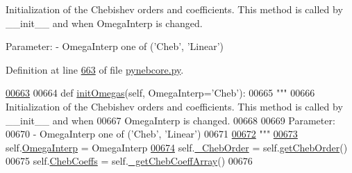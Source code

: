 \begin{DoxyVerb}Initialization of the Chebishev orders and coefficients. This method is called by __init__ and when 
OmegaInterp is changed.

Parameter:
    - OmegaInterp   one of ('Cheb', 'Linear')\end{DoxyVerb}
 

Definition at line \hyperlink{pynebcore_8py_source_l00663}{663} of file \hyperlink{pynebcore_8py_source}{pynebcore.\-py}.


\begin{DoxyCode}
\hypertarget{classpyneb_1_1core_1_1pynebcore_1_1___coll_data_fits_l00663}{}\hyperlink{classpyneb_1_1core_1_1pynebcore_1_1___coll_data_fits_ab8bb7b193ca2b9ccf6adf11453347226}{00663} 
00664     \textcolor{keyword}{def }\hyperlink{classpyneb_1_1core_1_1pynebcore_1_1___coll_data_fits_ab8bb7b193ca2b9ccf6adf11453347226}{initOmegas}(self, OmegaInterp='Cheb'):
00665         \textcolor{stringliteral}{"""}
00666 \textcolor{stringliteral}{        Initialization of the Chebishev orders and coefficients. This method is called by \_\_init\_\_ and when
       }
00667 \textcolor{stringliteral}{        OmegaInterp is changed.}
00668 \textcolor{stringliteral}{}
00669 \textcolor{stringliteral}{        Parameter:}
00670 \textcolor{stringliteral}{            - OmegaInterp   one of ('Cheb', 'Linear')}
00671 \textcolor{stringliteral}{        }
\hypertarget{classpyneb_1_1core_1_1pynebcore_1_1___coll_data_fits_l00672}{}\hyperlink{classpyneb_1_1core_1_1pynebcore_1_1___coll_data_fits_a3e15df449393d23d1ac760671b5828cc}{00672} \textcolor{stringliteral}{        """}
\hypertarget{classpyneb_1_1core_1_1pynebcore_1_1___coll_data_fits_l00673}{}\hyperlink{classpyneb_1_1core_1_1pynebcore_1_1___coll_data_fits_aeb6a6f312ca21c1e1b3aa72225a0d442}{00673}         self.\hyperlink{classpyneb_1_1core_1_1pynebcore_1_1___coll_data_fits_a3e15df449393d23d1ac760671b5828cc}{OmegaInterp} = OmegaInterp
\hypertarget{classpyneb_1_1core_1_1pynebcore_1_1___coll_data_fits_l00674}{}\hyperlink{classpyneb_1_1core_1_1pynebcore_1_1___coll_data_fits_af8eaa90b2ddbf77c0a78b648e9f66971}{00674}         self.\hyperlink{classpyneb_1_1core_1_1pynebcore_1_1___coll_data_fits_aeb6a6f312ca21c1e1b3aa72225a0d442}{\_ChebOrder} = self.\hyperlink{classpyneb_1_1core_1_1pynebcore_1_1___coll_data_fits_ac2e555f92570ed4df42926d0c415ac4c}{getChebOrder}()
00675         self.\hyperlink{classpyneb_1_1core_1_1pynebcore_1_1___coll_data_fits_af8eaa90b2ddbf77c0a78b648e9f66971}{ChebCoeffs} = self.\hyperlink{classpyneb_1_1core_1_1pynebcore_1_1___coll_data_fits_a6f9e4fd3e9196fe259da3175e14b88b9}{\_getChebCoeffArray}()
00676 

\end{DoxyCode}
